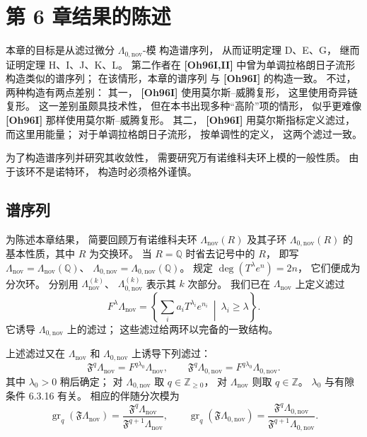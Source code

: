 
\section{第 6 章结果的陈述}
\label{sec:6-1}

本章的目标是从滤过微分
$\Lambda_{0,\mathrm{nov}}$-模
构造谱序列，
从而证明定理 D、E、G，
继而证明定理 H、I、J、K、L。
第二作者在
\textbf{[Oh96I,II]}
中曾为单调拉格朗日子流形
构造类似的谱序列；
在该情形，本章的谱序列
与 \textbf{[Oh96I]} 的构造一致。
不过，两种构造有两点差别：
其一，
\textbf{[Oh96I]}
使用莫尔斯--威腾复形，
这里使用奇异链复形。
这一差别虽颇具技术性，
但在本书出现多种“高阶”项的情形，
似乎更难像
\textbf{[Oh96I]}
那样使用莫尔斯--威腾复形。
其二，
\textbf{[Oh96I]} 用莫尔斯指标定义滤过，
而这里用能量；
对于单调拉格朗日子流形，
按单调性的定义，
这两个滤过一致。

为了构造谱序列并研究其收敛性，
需要研究万有诺维科夫环上模的一般性质。
由于该环不是诺特环，
构造时必须格外谨慎。

\subsection{谱序列}
\label{subsec:6-1-1}

为陈述本章结果，
简要回顾万有诺维科夫环
$\Lambda_{\mathrm{nov}}(R)$
及其子环
$\Lambda_{0,\mathrm{nov}}(R)$
的基本性质，其中 $R$ 为交换环。
当 $R=\mathbb Q$ 时省去记号中的 $R$，
即写
$\Lambda_{\mathrm{nov}}
=\Lambda_{\mathrm{nov}}(\mathbb Q)$、
$\Lambda_{0,\mathrm{nov}}
=\Lambda_{0,\mathrm{nov}}(\mathbb Q)$。
规定
$\deg(T^\lambda e^n)=2n$，
它们便成为分次环。
分别用
$\Lambda_{\mathrm{nov}}^{(k)}$、
$\Lambda_{0,\mathrm{nov}}^{(k)}$
表示其 $k$ 次部分。
我们已在
$\Lambda_{\mathrm{nov}}$
上定义滤过
\begin{equation}
F^\lambda\Lambda_{\mathrm{nov}}
=
\left\{
\sum_i a_iT^{\lambda_i}e^{n_i}
\ \middle|\ 
\lambda_i\ge\lambda
\right\}.
\tag{6.1.1}\label{eq:6-1-1}
\end{equation}
它诱导
$\Lambda_{0,\mathrm{nov}}$
上的滤过；
这些滤过给两环以完备的一致结构。

上述滤过又在
$\Lambda_{\mathrm{nov}}$
和 $\Lambda_{0,\mathrm{nov}}$
上诱导下列滤过：
\begin{equation}
\mathfrak F^q\Lambda_{\mathrm{nov}}
=F^{q\lambda_0}\Lambda_{\mathrm{nov}},
\qquad
\mathfrak F^q\Lambda_{0,\mathrm{nov}}
=F^{q\lambda_0}\Lambda_{0,\mathrm{nov}}.
\tag{6.1.2}\label{eq:6-1-2}
\end{equation}
其中 $\lambda_0>0$ 稍后确定；
对 $\Lambda_{0,\mathrm{nov}}$
取 $q\in\mathbb Z_{\ge0}$，
对 $\Lambda_{\mathrm{nov}}$
则取 $q\in\mathbb Z$。
$\lambda_0$ 与有隙条件
6.3.16 有关。
相应的伴随分次模为
\begin{equation}
\operatorname{gr}_q
(\mathfrak F\Lambda_{\mathrm{nov}})
=
\frac{\mathfrak F^q\Lambda_{\mathrm{nov}}}
{\mathfrak F^{q+1}\Lambda_{\mathrm{nov}}},
\qquad
\operatorname{gr}_q
(\mathfrak F\Lambda_{0,\mathrm{nov}})
=
\frac{\mathfrak F^q\Lambda_{0,\mathrm{nov}}}
{\mathfrak F^{q+1}\Lambda_{0,\mathrm{nov}}}.
\tag{6.1.3}\label{eq:6-1-3}
\end{equation}

